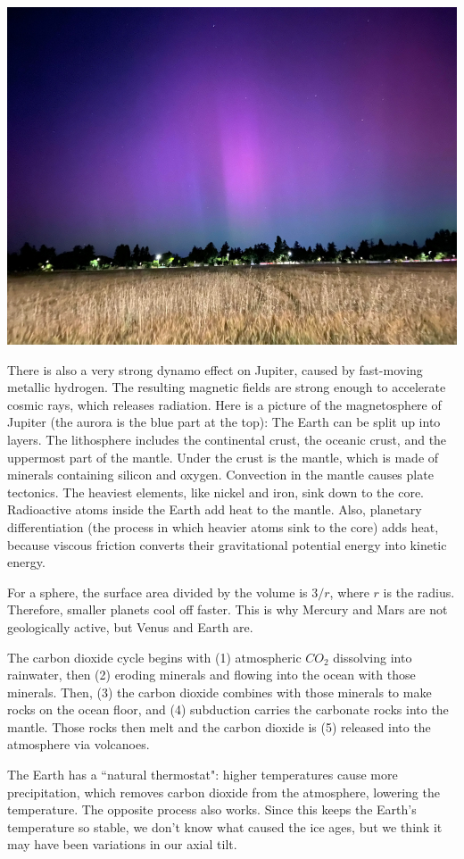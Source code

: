 \documentclass[class=article, crop=false]{standalone}
\begin{document}
\begin{center}
    \includegraphics[width=.7\textwidth]{aurora_in_davis.png}
\end{center}
There is also a very strong dynamo effect on Jupiter, caused by fast-moving metallic hydrogen. The resulting magnetic fields are strong enough to accelerate cosmic rays, which releases radiation. Here is a picture of the magnetosphere of Jupiter (the aurora is the blue part at the top):
The Earth can be split up into layers. The lithosphere includes the continental crust, the oceanic crust, and the uppermost part of the mantle. Under the crust is the mantle, which is made of minerals containing silicon and oxygen. Convection in the mantle causes plate tectonics. The heaviest elements, like nickel and iron, sink down to the core. Radioactive atoms inside the Earth add heat to the mantle. Also, planetary differentiation (the process in which heavier atoms sink to the core) adds heat, because viscous friction converts their gravitational potential energy into kinetic energy.
\par
For a sphere, the surface area divided by the volume is $3/r$, where $r$ is the radius. Therefore, smaller planets cool off faster. This is why Mercury and Mars are not geologically active, but Venus and Earth are.
\par
The carbon dioxide cycle begins with (1) atmospheric $CO_2$ dissolving into rainwater, then (2) eroding minerals and flowing into the ocean with those minerals. Then, (3) the carbon dioxide combines with those minerals to make rocks on the ocean floor, and (4) subduction carries the carbonate rocks into the mantle. Those rocks then melt and the carbon dioxide is (5) released into the atmosphere via volcanoes.
\par
The Earth has a ``natural thermostat": higher temperatures cause more precipitation, which removes carbon dioxide from the atmosphere, lowering the temperature. The opposite process also works. Since this keeps the Earth's temperature so stable, we don't know what caused the ice ages, but we think it may have been variations in our axial tilt.
\end{document}
